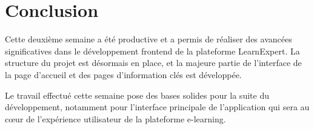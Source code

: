\documentclass[12pt, a4paper]{article}
\begin{document}
\section{Conclusion}

Cette deuxième semaine a été productive et a permis de réaliser des avancées significatives dans le développement frontend de la plateforme LearnExpert. La structure du projet est désormais en place, et la majeure partie de l'interface de la page d'accueil et des pages d'information clés est développée.

Le travail effectué cette semaine pose des bases solides pour la suite du développement, notamment pour l'interface principale de l'application qui sera au cœur de l'expérience utilisateur de la plateforme e-learning.
\end{document}
